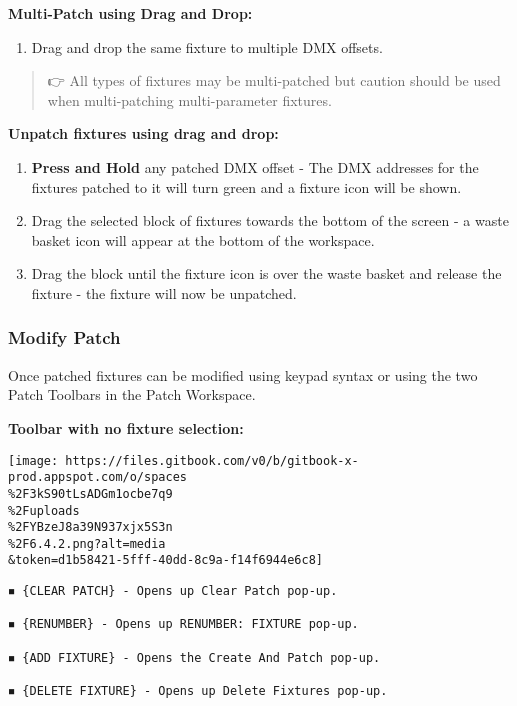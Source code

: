\documentclass[
]{article}
\providecommand{\tightlist}{%
  \setlength{\itemsep}{0pt}\setlength{\parskip}{0pt}}
\begin{document}
\textbf{Multi-Patch using Drag and Drop:}

\begin{enumerate}
\def\labelenumi{\arabic{enumi}.}
\tightlist
\item
  Drag and drop the same fixture to multiple DMX offsets.
\end{enumerate}

\begin{quote}
👉 All types of fixtures may be multi-patched but caution should be used when multi-patching multi-parameter fixtures.
\end{quote}

\textbf{Unpatch fixtures using drag and drop:}

\begin{enumerate}
\def\labelenumi{\arabic{enumi}.}
\item
  \textbf{Press and Hold} any patched DMX offset - The DMX addresses for the fixtures patched to it will turn green and a fixture icon will be shown.
\item
  Drag the selected block of fixtures towards the bottom of the screen - a waste basket icon will appear at the bottom of the workspace.
\item
  Drag the block until the fixture icon is over the waste basket and release the fixture - the fixture will now be unpatched.
\end{enumerate}

\hypertarget{modify-patch}{%
\subsubsection{Modify Patch}\label{modify-patch}}

Once patched fixtures can be modified using keypad syntax or using the two Patch Toolbars in the Patch Workspace.

\textbf{Toolbar with no fixture selection:}

\texttt{[image: https://files.gitbook.com/v0/b/gitbook-x-prod.appspot.com/o/spaces\\\%2F3kS90tLsADGm1ocbe7q9\\\%2Fuploads\\\%2FYBzeJ8a39N937xjx5S3n\\\%2F6.4.2.png?alt=media\\\&token=d1b58421-5fff-40dd-8c9a-f14f6944e6c8]}

\begin{verbatim}
◾ {CLEAR PATCH} - Opens up Clear Patch pop-up. 

◾ {RENUMBER} - Opens up RENUMBER: FIXTURE pop-up. 

◾ {ADD FIXTURE} - Opens the Create And Patch pop-up. 

◾ {DELETE FIXTURE} - Opens up Delete Fixtures pop-up.
\end{verbatim}
\end{document}
